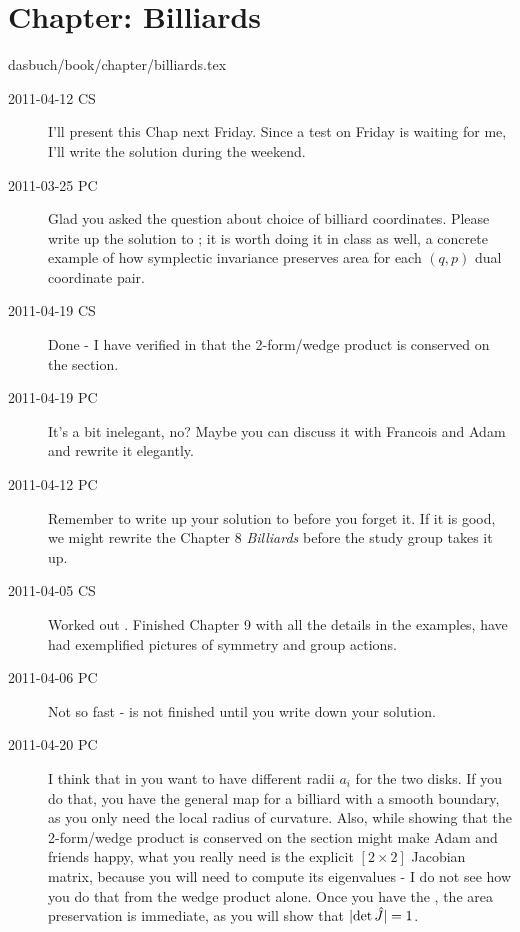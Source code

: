 \section{Chapter: Billiards}\noindent dasbuch/book/chapter/billiards.tex
\begin{description}

\item[2011-04-12 CS] I'll present this Chap next Friday. Since a
test on Friday is waiting for me, I'll write the solution during the weekend.

\item[2011-03-25 PC]
Glad you asked the question about choice of billiard coordinates. Please
write up the solution to ; it is worth doing it in
class as well, a concrete example of how symplectic invariance preserves
area for each $(q,p)$ dual coordinate  pair.

\item[2011-04-19 CS] Done - I have verified in  that
the 2-form/wedge product is conserved on the \Poincare section.

\item[2011-04-19 PC] It's a bit inelegant, no? Maybe you can discuss it with
Francois and Adam and rewrite it elegantly.

\item[2011-04-12 PC] Remember to write up your solution to
 before you forget it. If it is good, we might
rewrite the Chapter 8 {\em Billiards} before the study group takes it up.

\item[2011-04-05 CS] Worked out . Finished Chapter 9
with all the details in the examples, have had exemplified pictures of
symmetry and group actions.

\item[2011-04-06 PC] Not so fast -  is not finished
until you write down your solution.

\item[2011-04-20 PC]  I think that in  you want to
have different radii $a_i$ for the two disks. If you do that, you have
the general map for a billiard with a smooth boundary, as you only need the
local radius of curvature. Also, while showing that
the 2-form/wedge product is conserved on the \Poincare section might make
Adam and friends happy, what you really need is the explicit $[2\!\times\!2]$
Jacobian matrix, because you will need to compute its eigenvalues - I do not see
how you do that from the wedge product alone. Once you have the \jacobianM,
the area preservation is immediate, as you will show that $|\mbox{\rm det}\, \hat{J} |= 1$.


\end{description}

